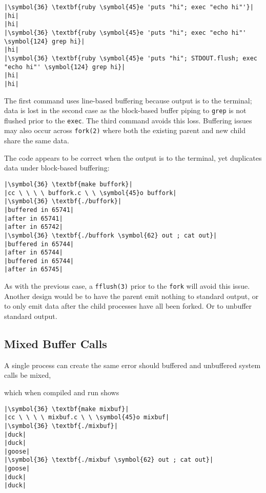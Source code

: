 \documentclass[10pt,a4paper]{article}
\begin{document}
\begin{lstlisting}
|\symbol{36} \textbf{ruby \symbol{45}e 'puts "hi"; exec "echo hi"'}|
|hi|
|hi|
|\symbol{36} \textbf{ruby \symbol{45}e 'puts "hi"; exec "echo hi"' \symbol{124} grep hi}|
|hi|
|\symbol{36} \textbf{ruby \symbol{45}e 'puts "hi"; STDOUT.flush; exec "echo hi"' \symbol{124} grep hi}|
|hi|
|hi|
\end{lstlisting}

The first command uses line-based buffering because output is to the
terminal; data is lost in the second case as the block-based buffer
piping to \texttt{grep} is not flushed prior to the \texttt{exec}. The
third command avoids this loss. Buffering issues may also occur across
\texttt{fork(2)} where both the existing parent and new child share the
same data.



The code appears to be correct when the output is to the terminal, yet
duplicates data under block-based buffering:

\begin{lstlisting}
|\symbol{36} \textbf{make buffork}|
|cc \ \ \ \ buffork.c \ \ \symbol{45}o buffork|
|\symbol{36} \textbf{./buffork}|
|buffered in 65741|
|after in 65741|
|after in 65742|
|\symbol{36} \textbf{./buffork \symbol{62} out ; cat out}|
|buffered in 65744|
|after in 65744|
|buffered in 65744|
|after in 65745|
\end{lstlisting}

As with the previous case, a \texttt{fflush(3)} prior to the
\texttt{fork} will avoid this issue. Another design would be to have the
parent emit nothing to standard output, or to only emit data after the
child processes have all been forked. Or to unbuffer standard output.

\subsection*{Mixed Buffer Calls}

A single process can create the same error should buffered and
unbuffered system calls be mixed,



which when compiled and run shows

\begin{lstlisting}
|\symbol{36} \textbf{make mixbuf}|
|cc \ \ \ \ mixbuf.c \ \ \symbol{45}o mixbuf|
|\symbol{36} \textbf{./mixbuf}|
|duck|
|duck|
|goose|
|\symbol{36} \textbf{./mixbuf \symbol{62} out ; cat out}|
|goose|
|duck|
|duck|
\end{lstlisting}
\end{document}

